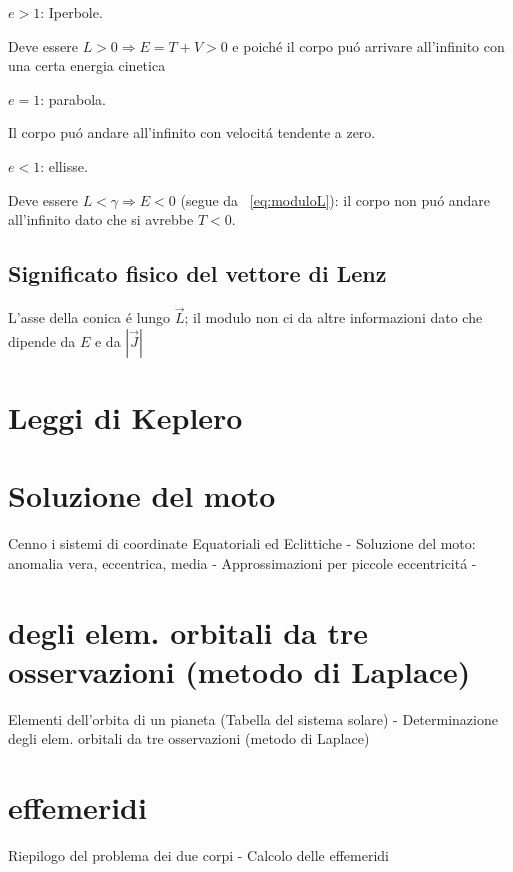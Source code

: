 \begin{itemize*}
\item $e>1$: Iperbole.

Deve essere $L>0\Rightarrow E=T+V>0$ e poich\'e  il corpo pu\'o arrivare all'infinito con una certa energia cinetica

\item $e=1$: parabola.

Il corpo pu\'o andare all'infinito con velocit\'a tendente a zero.

\item $e<1$: ellisse.

Deve essere $L<\gamma\Rightarrow E<0$ (segue da ~\ref{eq:moduloL}): il corpo non pu\'o andare all'infinito dato che si avrebbe $T<0$.

\end{itemize*}

\subsection{Significato fisico del vettore di Lenz}

L'asse della conica \'e lungo $\vec{L}$; il modulo non ci da altre informazioni dato che dipende da $E$ e da $|\vec{J}|$ 



\section{Leggi di Keplero}



\section{Soluzione del moto}
Cenno i sistemi di coordinate Equatoriali ed Eclittiche - Soluzione del moto: anomalia vera, eccentrica, media - Approssimazioni per piccole eccentricit\'a - 

\section{ degli elem. orbitali da tre osservazioni (metodo di Laplace) }
Elementi dell'orbita di un pianeta (Tabella del sistema solare) - Determinazione degli elem. orbitali da tre osservazioni (metodo di Laplace) 

\section{effemeridi}
Riepilogo del problema dei due corpi - Calcolo delle effemeridi


